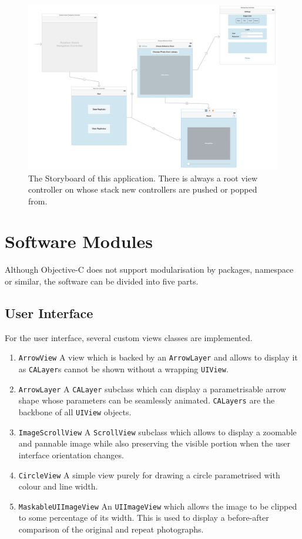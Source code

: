 \begin{figure}[h]
   {\centering      
   \includegraphics[width=\textwidth]{gfx/storyboard.png}
   \caption[Storyboard example]{The Storyboard of this application. There is
   always a root view controller on whose stack new controllers are pushed or
popped from.}
   \label{fig:storyboard}}
\end{figure}

\section{Software Modules}

Although Objective-C does not support modularisation by packages, namespace or
similar, the software can be divided into five parts.

\subsection{User Interface}

For the user interface, several custom views classes are implemented.
\begin{enumerate}
   \item \texttt{ArrowView} A view which is backed by an \texttt{ArrowLayer} and
      allows to display it as \texttt{CALayer}s cannot be shown without a
      wrapping \texttt{UIView}.
   \item \texttt{ArrowLayer} A \texttt{CALayer} subclass which can display a
      parametrisable arrow shape whose parameters can be seamlessly animated.
      \texttt{CALayers} are the backbone of all \texttt{UIView} objects.
   \item \texttt{ImageScrollView} A \texttt{ScrollView} subclass which allows to
      display a zoomable and pannable image while also preserving the visible
      portion when the user interface orientation changes.
   \item \texttt{CircleView} A simple view purely for drawing a circle parametrised
      with colour and line width.
   \item \texttt{MaskableUIImageView} An \texttt{UIImageView} which allows the
      image to be clipped to some percentage of its width. This is used to
      display a before-after comparison of the original and repeat photographs.
\end{enumerate}
 
